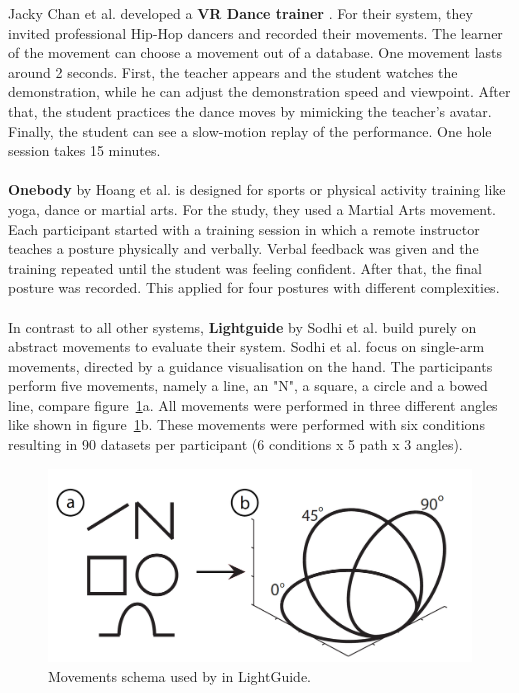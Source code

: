 Jacky Chan et al. developed a \textbf{VR Dance trainer} \cite{Chan2010}. For their system, they invited professional Hip-Hop dancers and recorded their movements. The learner of the movement can choose a movement out of a database. One movement lasts around 2 seconds. First, the teacher appears and the student watches the demonstration, while he can adjust the demonstration speed and viewpoint. After that, the student practices the dance moves by mimicking the teacher's avatar. Finally, the student can see a slow-motion replay of the performance. One hole session takes 15 minutes.\\ \\
\textbf{Onebody} by Hoang et al. \cite{Hoang2016} is designed for sports or physical activity training like yoga, dance or martial arts. For the study, they used a Martial Arts movement. Each participant started with a training session in which a remote instructor teaches a posture physically and verbally. Verbal feedback was given and the training repeated until the student was feeling confident. After that, the final posture was recorded. This applied for four postures with different complexities.\\ \\
In contrast to all other systems, \textbf{Lightguide} by Sodhi et al. \cite{Sodhi2012} build purely on abstract movements to evaluate their system. Sodhi et al. focus on single-arm movements, directed by a guidance visualisation on the hand. The participants perform five movements, namely a line, an "N", a square, a circle and a bowed line, compare figure~\ref{fig:lightguide1}a. All movements were performed in three different angles like shown in figure~\ref{fig:lightguide1}b. These movements were performed with six conditions resulting in 90 datasets per participant (6 conditions x 5 path x 3 angles).
\begin{figure}
	\centering
	\includegraphics[width=1.0\textwidth]{img/lightguide_movements.PNG}
	\caption{Movements schema used by \cite{Sodhi2012} in LightGuide.}
	\label{fig:lightguide1}
\end{figure}\\

